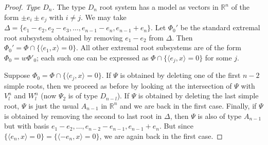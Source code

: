 \documentclass[10pt,a4paper]{amsart}
\begin{document}
\begin{proof}

\medskip

\noindent \textit{Type $D_n$.} The type $D_n$ root system has a model as vectors in $\mathbb{R}^n$ of the form $\pm e_i \pm e_j$ with $i \neq j$. We may take $\Delta = \{e_1 - e_2, e_2 - e_3, \dots, e_{n-1} - e_n, e_{n-1} + e_n \}$. Let $\Phi_0'$ be the standard extremal root subsystem obtained by removing $e_1 - e_2$ from $\Delta$. Then $\Phi_0' = \Phi \cap \{\langle e_1, x \rangle = 0\}$. All other extremal root subsystems are of the form $\Phi_0=w \Phi'_0$; each such one can be expressed as $\Phi\cap \{\langle e_j, x \rangle = 0\}$ for some $j$.

 Suppose $\Phi_0= \Phi\cap \{\langle e_j, x \rangle = 0\}$. If $\Psi$ is obtained by deleting one of the first $n-2$ simple roots, then we proceed as before by looking at the intersection of $\Psi$ with $V_l^n$ and $W_l^n$ (now $\Psi_2$ is of type $D_{n-l}$). If $\Psi$ is obtained by deleting the last simple root, $\Psi$ is just the usual $A_{n-1}$ in $\mathbb{R}^n$ and we are back in the first case. Finally, if $\Psi$ is obtained by removing the second to last root in $\Delta$, then $\Psi$ is also of type $A_{n-1}$ but with basis $e_1-e_2,\ldots, e_{n-2}-e_{n-1}, e_{n-1}+e_n$. But since $\{ \langle e_n, x \rangle = 0 \}= \{ \langle -e_n, x \rangle = 0 \}$, we are again back in the first case.
    
    

\end{proof}
\end{document}
